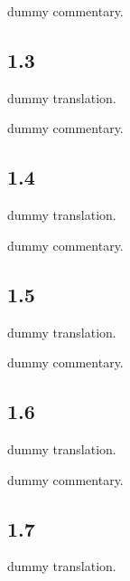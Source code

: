 \begin{ekdosis}
  \begin{philcomm}[hp01_002]
    dummy commentary.
  \end{philcomm}


  \subsection*{1.3}
  \begin{translation}[hp01_003]
    dummy translation.
  \end{translation}
  
  \begin{philcomm}[hp01_003]          
    dummy commentary.
  \end{philcomm}


  \subsection*{1.4}
  \begin{translation}[hp01_004]
    dummy translation.
  \end{translation}
  
  \begin{philcomm}[hp01_004]          
    dummy commentary.
  \end{philcomm}



  \subsection*{1.5}
  \begin{translation}[hp01_005]
    dummy translation.
  \end{translation}
  
  \begin{philcomm}[hp01_005]          
    dummy commentary.
  \end{philcomm}


  \subsection*{1.6}
  \begin{translation}[hp01_006]
    dummy translation.
  \end{translation}
  
  \begin{philcomm}[hp01_006]          
    dummy commentary.
  \end{philcomm}



  \subsection*{1.7}
  \begin{translation}[hp01_007]
    dummy translation.
  \end{translation}
  

\end{ekdosis}
